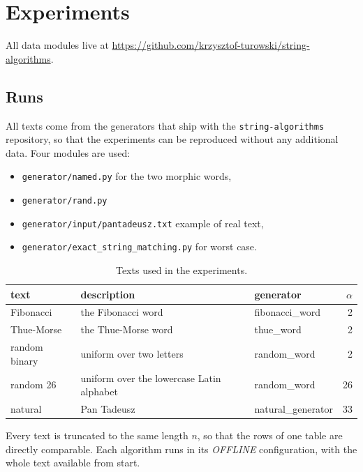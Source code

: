 
\section{Experiments}
\label{seq:experiments}

\noindent All data modules live at \url{https://github.com/krzysztof-turowski/string-algorithms}.

\subsection{Runs}
All texts come from the generators that ship with the \texttt{string-algorithms} repository, so that the experiments can be reproduced without any additional data. 
Four modules are used:
\begin{itemize}
    \item \texttt{generator/named.py} for the two morphic words,
    \item \texttt{generator/rand.py} 
    \item \texttt{generator/input/pantadeusz.txt} example of real text, 
    \item \texttt{generator/exact\_string\_matching.py} for worst case.
\end{itemize}



\begin{table}[H]
\centering
\begin{tabular}{lp{6.0cm}p{5.5cm}r}
\hline
text & description & generator & $\alpha$ \\
\hline
Fibonacci & the Fibonacci word & fibonacci\_word & 2 \\
Thue-Morse & the Thue-Morse word & thue\_word & 2 \\
random binary & uniform over two letters & random\_word & 2 \\
random 26 & uniform over the lowercase Latin alphabet & random\_word & 26 \\
natural & Pan Tadeusz & natural\_generator & 33 \\
\hline
\end{tabular}
\caption{Texts used in the experiments.}
\label{tab:texts}
\end{table}

Every text is truncated to the same length $n$, so that the rows of one table are directly comparable. Each algorithm runs in its \emph{OFFLINE} configuration, with the whole text available from start.


